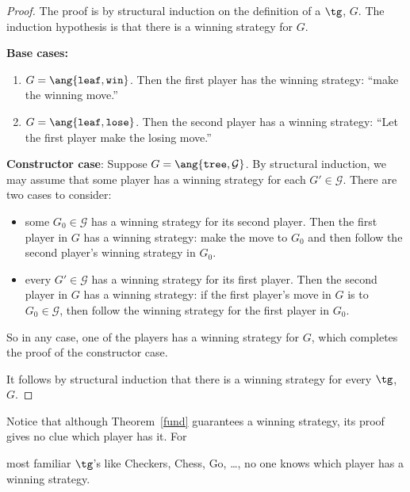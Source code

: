 \begin{definition}
\begin{proof}
The proof is by structural induction on the definition of a $\tg$, $G$.
The induction hypothesis is that there is a winning strategy for $G$.

\textbf{Base cases:}
\begin{enumerate}

\item $G=\ang{\texttt{leaf}, \texttt{win}}$.  Then the first player has the
 winning strategy: ``make the winning move.''

\item $G=\ang{\texttt{leaf}, \texttt{lose}}$.  Then the second player has a
 winning strategy: ``Let the first player make the losing move.''
\end{enumerate}

\textbf{Constructor case}: Suppose $G = \ang{\texttt{tree},\mathcal{G}}$.
By structural induction, we may assume that some player has a winning
strategy for each $G' \in \mathcal{G}$.  There are two cases to consider:
\begin{itemize}
\item some $G_0 \in \mathcal{G}$ has a winning strategy for its second
  player.  Then the first player in $G$ has a winning strategy: make the
  move to $G_0$ and then follow the second player's winning strategy in
  $G_0$.

\item every $G' \in \mathcal{G}$ has a winning strategy for its first
  player.  Then the second player in $G$ has a winning strategy: if the
  first player's move in $G$ is to $G_0 \in \mathcal{G}$, then follow the
  winning strategy for the first player in $G_0$.
\end{itemize}
So in any case, one of the players has a winning strategy for $G$, which
completes the proof of the constructor case.

It follows by structural induction that there is a winning strategy for
every $\tg$, $G$.
\end{proof}

Notice that although Theorem~\ref{fund} guarantees a winning strategy, its
proof gives no clue which player has it.  For

most familiar $\tg$'s like Checkers, Chess, Go, \dots, no one knows
which player has a winning strategy.




\end{definition}
